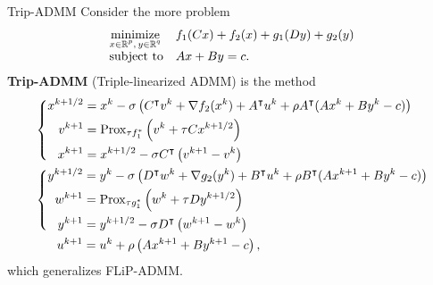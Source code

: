 \documentclass[10pt,mathserif]{beamer}
\begin{document}
\begin{frame}{Trip-ADMM}
Consider the more problem
\[
\begin{array}{ll}
\underset{\substack{x\in \mathbb{R}^p,\,y\in \mathbb{R}^q}}{\mbox{minimize}}&f_1(Cx)+f_2(x)+g_1(Dy)+g_2(y)\\
\mbox{subject to}&Ax+By=c.
\end{array}
\]
\textbf{Trip-ADMM} (Triple-linearized ADMM)  is the method
\begin{align*}
&\left\{
  \begin{alignedat}{2}
    x^{k+1/2}&=x^k- \sigma\left(C^\intercal v^{k}+\nabla f_2(x^k) + A^\intercal  u^k+ \rho A^\intercal ( Ax^k+By^k-c)\right)\\
    v^{k+1}&=\mathrm{Prox}_{\tau f_1^*}\left(v^k+\tau Cx^{k+1/2}\right)\\
    x^{k+1}&=x^{k+1/2}-\sigma C^\intercal \left(v^{k+1}-v^k\right)
  \end{alignedat}
\right. \\
&\left\{
  \begin{alignedat}{2}
    y^{k+1/2}&=y^k-\sigma\left(D^\intercal w^{k}+\nabla g_2(y^k) + B^\intercal  u^k+\rho B^\intercal (Ax^{k+1}+By^k-c)\right)\\
    w^{k+1}&=\mathrm{Prox}_{\tau g_1^*}\left(w^k+\tau Dy^{k+1/2}\right)\\
    y^{k+1}&=y^{k+1/2}-\sigma D^\intercal \left(w^{k+1}-w^k\right)
  \end{alignedat}
\right. \\
&\hspace{18pt}u^{k+1}=u^k+\rho\left(Ax^{k+1}+By^{k+1}-c\right),
\end{align*}
which generalizes FLiP-ADMM. 
\end{frame}
\end{document}
